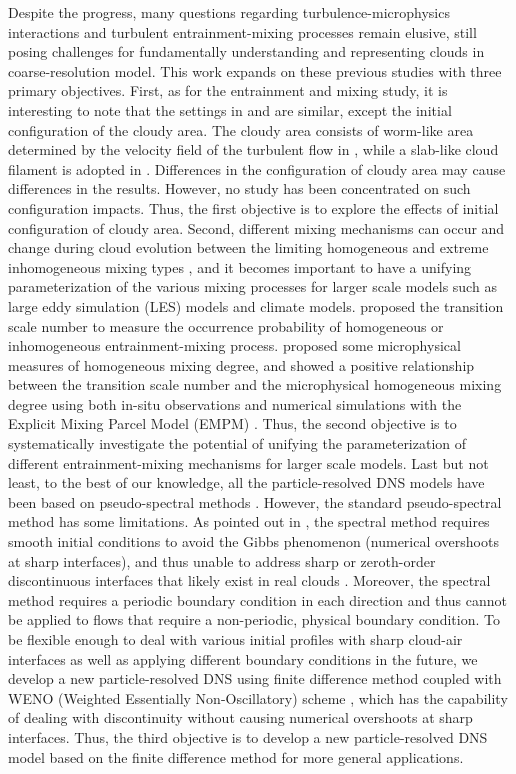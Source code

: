 \documentclass[draft,linenumbers]{AGUJournal}
\begin{document}
Despite the progress, many questions regarding turbulence-microphysics interactions and turbulent entrainment-mixing processes remain elusive, still posing challenges for fundamentally understanding and representing clouds in coarse-resolution model. This work expands on these previous studies with three primary objectives. First, as for the entrainment and mixing study, it is interesting to note that the settings in \citet{Kumar12} and \citet{And04} are similar, except the initial configuration of the cloudy area. The cloudy area consists of worm-like area determined by the velocity field of the turbulent flow in \citet{And04}, while a slab-like cloud filament is adopted in \citet{Kumar12}. Differences in the configuration of cloudy area may cause differences in the results. However, no study has been concentrated on such configuration impacts. Thus, the first objective is to explore the effects of initial configuration of cloudy area. Second, different mixing mechanisms can occur and change during cloud evolution between the limiting homogeneous and extreme inhomogeneous mixing types \citep{And09, Burnet1992, Lehmann2009}, and it becomes important to have a unifying parameterization of the various mixing processes for larger scale models such as large eddy simulation (LES) models and climate models. \citet{Lu2011} proposed the transition scale number to measure the occurrence probability of homogeneous or inhomogeneous entrainment-mixing process. \citet{Lu2013, Lu2014} proposed some microphysical measures of homogeneous mixing degree, and showed a positive relationship between the transition scale number and the microphysical homogeneous mixing degree using both in-situ observations and numerical simulations with the Explicit Mixing Parcel Model (EMPM) \citep{Krueger1997Modeling,Su1998}. Thus, the second objective is to systematically investigate the potential of unifying the parameterization of different entrainment-mixing mechanisms for larger scale models. Last but not least, to the best of our knowledge, all the particle-resolved DNS models have been based on pseudo-spectral methods \citep{Rogallo81, Orszag72, Celani05, Kumar12}. However, the standard pseudo-spectral method has some limitations. As pointed out in \citet{Kumar12}, the spectral method requires smooth initial conditions to avoid the Gibbs phenomenon (numerical overshoots at sharp interfaces), and thus unable to address sharp or zeroth-order discontinuous interfaces that likely exist in real clouds \citep{Brenguier1993}. Moreover, the spectral method requires a periodic boundary condition in each direction and thus cannot be applied to flows that require a non-periodic, physical boundary condition. To be flexible enough to deal with various initial profiles with sharp cloud-air interfaces as well as applying different boundary conditions in the future, we develop a new particle-resolved DNS using finite difference method coupled with WENO (Weighted Essentially Non-Oscillatory) scheme \citep{JiangShu1996}, which has the capability of dealing with discontinuity without causing numerical overshoots at sharp interfaces. Thus, the third objective is to develop a new particle-resolved DNS model based on the finite difference method for more general applications.
\end{document}
